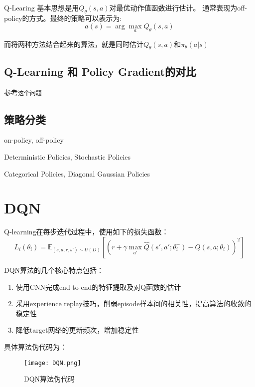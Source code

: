 Q-Learing 基本思想是用$Q_\theta(s,a)$对最优动作值函数进行估计。
通常表现为off-policy的方式。最终的策略可以表示为:
\begin{equation*}
a(s) = \arg \max_a Q_\theta(s,a)
\end{equation*}

而将两种方法结合起来的算法，就是同时估计$Q_\theta(s,a)$和$\pi_\theta(a|s)$

\subsection{Q-Learning 和 Policy Gradient的对比}
参考\href{https://www.zhihu.com/question/49787932}{\texttt{这个问题}}




\subsection{策略分类}
on-policy, off-policy

Deterministic Policies, Stochastic Policies

Categorical Policies, Diagonal Gaussian Policies

\section{DQN}
Q-learning在每步迭代过程中，使用如下的损失函数：
\begin{equation*}
    L_i(\theta_i) = \mathbb{E}_{(s,a,r,s')\sim U(D)} \left[ \left( r+\gamma \max_{a'} \hat{Q}(s',a';\theta_i^-) - Q(s,a;\theta_i) \right)^2 \right]
\end{equation*}

DQN算法的几个核心特点包括：
\begin{enumerate}
    \item 使用CNN完成end-to-end的特征提取及对Q函数的估计
    \item 采用experience replay技巧，削弱episode样本间的相关性，提高算法的收敛的稳定性
    \item 降低target网络的更新频次，增加稳定性
\end{enumerate}

具体算法伪代码为：
\begin{figure}[htbp]
	\figskip 
	\centering
	\texttt{[image: DQN.png]}	  
	\caption{\label{fig: dqn} DQN算法伪代码}
\end{figure}

